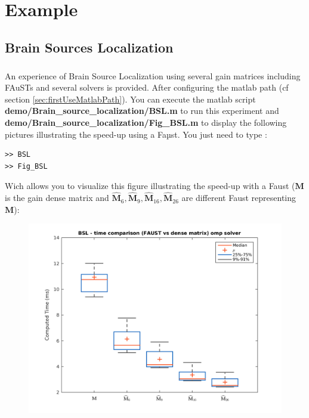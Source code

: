 \chapter{Example}\label{sec:example}

\section{Brain Sources Localization}\label{sec:BSL_example}
%



\paragraph{} An experience of Brain Source Localization using several gain matrices including FAuSTs and several solvers is provided. After configuring the matlab path (cf section \ref{sec:firstUseMatlabPath}). You can execute the matlab script \textbf{demo/Brain\_source\_localization/BSL.m} to run this experiment and \textbf{demo/Brain\_source\_localization/Fig\_BSL.m} to display the following pictures illustrating the speed-up using a Faµst.
You just need to type :
\begin{lstlisting}
>> BSL
>> Fig_BSL
\end{lstlisting}

Wich allows you to visualize this figure illustrating the speed-up with a Faust ($\mathbf{M}$ is the gain dense matrix and $\widehat{\mathbf{M}}_{6},\widehat{\mathbf{M}}_{9},\widehat{\mathbf{M}}_{16},\widehat{\mathbf{M}}_{26}$ are different Faust representing  $\mathbf{M}$):

\begin{figure}[!htbp]
\label{fig:BSL}
\includegraphics[scale=0.7]{images/BSL.png}
\end{figure}
